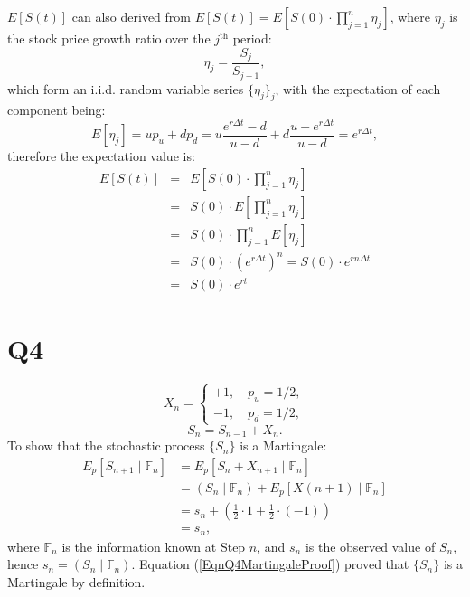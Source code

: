 \documentclass[final,3p,times]{elsarticle}
\begin{document}
		$E[S(t)]$ can also derived from $E[S(t)]=E[S(0) \cdot \prod\limits_{j=1}^{n} \eta_j]$, where $\eta_j$ is the stock price growth ratio over the $j^\mathrm{th}$ period:
		\begin{equation}
			\eta_j=\frac{S_j}{S_{j-1}}
			,
		\end{equation}
		which form an i.i.d. random variable series $\{\eta_j\}_j$, with the expectation of each component being:
		\begin{equation}
			E[\eta_j]=u p_u + d p_d = u \frac{e^{r \Delta t} - d}{u-d} + d \frac{u - e^{r \Delta t}}{u-d} = e^{r \Delta t}
			,
		\end{equation}
		therefore the expectation value is:
		\begin{eqnarray}
			E[S(t)]&=&E[S(0) \cdot \prod\limits_{j=1}^{n} \eta_j]
			\nonumber\\
			&=&S(0) \cdot E[\prod\limits_{j=1}^{n} \eta_j]
			\nonumber\\
			&=&S(0) \cdot \prod\limits_{j=1}^{n} E[\eta_j]
			\nonumber\\
			&=&S(0) \cdot \left( e^{r \Delta t} \right)^n = S(0) \cdot e^{rn\Delta t}
			\nonumber\\
			&=&S(0) \cdot e^{rt}
		\end{eqnarray}
		
\section{Q4}
	\begin{equation}
		X_n=
		\begin{cases}
			+1, \quad p_u=1/2, \\
			-1, \quad p_d=1/2,
		\end{cases}
	\end{equation}
	\begin{equation}
		S_n=S_{n-1}+X_n.
	\end{equation}
	To show that the stochastic process $\{S_n\}$ is a Martingale:
	\begin{equation}
		\label{EqnQ4MartingaleProof}
		\begin{split}
			E_p[S_{n+1}\mid\mathbb{F}_n] &= E_p[S_n+X_{n+1}\mid\mathbb{F}_n] \\
			&= \left(S_n\mid\mathbb{F}_n\right) + E_p[X(n+1)\mid\mathbb{F}_n] \\
			&= s_n + \left(\frac{1}{2}\cdot 1+\frac{1}{2}\cdot (-1)\right) \\
			&= s_n
			,
		\end{split}
	\end{equation}
	where $\mathbb{F}_n$ is the information known at Step $n$, and $s_n$ is the observed value of $S_n$, hence $s_n = \left(S_n\mid\mathbb{F}_n\right)$. Equation (\ref{EqnQ4MartingaleProof}) proved that $\{S_n\}$ is a Martingale by definition.
	
\end{document}
